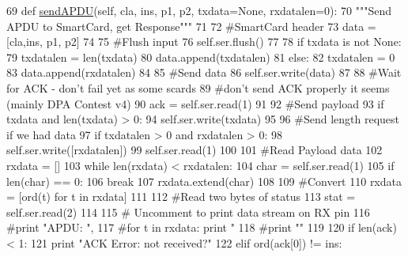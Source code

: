 \begin{DoxyCode}
69     \textcolor{keyword}{def }\hyperlink{classsoftware_1_1chipwhisperer_1_1capture_1_1targets_1_1smartcard__readers_1_1system__ser_1_1ReaderSystemSER_a2add2193a9bb5e7f7d74bbc93d0f7129}{sendAPDU}(self, cla, ins, p1, p2, txdata=None, rxdatalen=0):
70         \textcolor{stringliteral}{"""Send APDU to SmartCard, get Response"""}
71 
72         \textcolor{comment}{#SmartCard header}
73         data = [cla,ins, p1, p2]
74 
75         \textcolor{comment}{#Flush input}
76         self.ser.flush()
77 
78         \textcolor{keywordflow}{if} txdata \textcolor{keywordflow}{is} \textcolor{keywordflow}{not} \textcolor{keywordtype}{None}:
79             txdatalen = len(txdata)
80             data.append(txdatalen)
81         \textcolor{keywordflow}{else}:
82             txdatalen = 0
83             data.append(rxdatalen)
84 
85         \textcolor{comment}{#Send data}
86         self.ser.write(data)
87 
88         \textcolor{comment}{#Wait for ACK - don't fail yet as some scards}
89         \textcolor{comment}{#don't send ACK properly it seems (mainly DPA Contest v4)}
90         ack = self.ser.read(1)
91 
92         \textcolor{comment}{#Send payload}
93         \textcolor{keywordflow}{if} txdata \textcolor{keywordflow}{and} len(txdata) > 0:
94             self.ser.write(txdata)
95 
96         \textcolor{comment}{#Send length request if we had data}
97         \textcolor{keywordflow}{if} txdatalen > 0 \textcolor{keywordflow}{and} rxdatalen > 0:
98             self.ser.write([rxdatalen])
99             self.ser.read(1)
100 
101         \textcolor{comment}{#Read Payload data}
102         rxdata = []
103         \textcolor{keywordflow}{while} len(rxdata) < rxdatalen:
104             char = self.ser.read(1)
105             \textcolor{keywordflow}{if} len(char) == 0:
106                 \textcolor{keywordflow}{break}
107             rxdata.extend(char)
108 
109         \textcolor{comment}{#Convert}
110         rxdata = [ord(t) \textcolor{keywordflow}{for} t \textcolor{keywordflow}{in} rxdata]
111 
112         \textcolor{comment}{#Read two bytes of status}
113         stat = self.ser.read(2)
114 
115         \textcolor{comment}{# Uncomment to print data stream on RX pin}
116         \textcolor{comment}{#print "APDU: ",}
117         \textcolor{comment}{#for t in rxdata: print "%
118         \textcolor{comment}{#print ""}
119 
120         \textcolor{keywordflow}{if} len(ack) < 1:
121             \textcolor{keywordflow}{print} \textcolor{stringliteral}{"ACK Error: not received?"}
122         \textcolor{keywordflow}{elif} ord(ack[0]) != ins:
}
\end{DoxyCode}
